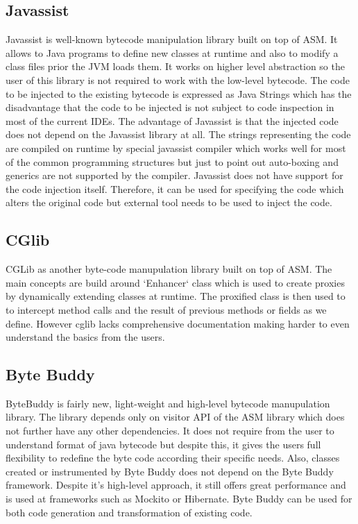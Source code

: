 \subsection{Javassist}
Javassist is well-known bytecode manipulation library built on top of ASM. It allows to Java programs to define new classes at runtime and also to modify a class files prior the JVM loads them. It works on higher level abstraction so the user of this library is not required to work with the low-level bytecode. The code to be injected to the existing bytecode is expressed as Java Strings which has the disadvantage that the code to be injected is not subject to code inspection in most of the current IDEs. The advantage of Javassist is that the injected code does not depend on the Javassist library at all. 
The strings representing the code are compiled on runtime by special javassist compiler which works well for most of the common programming structures but just to point out auto-boxing and generics are not supported by the compiler.
Javassist does not have support for the code injection itself. Therefore, it can be used for specifying the code which alters the original code but external tool needs to be used to inject the code.
\subsection{CGlib}
CGLib as another byte-code manupulation library built on top of ASM. The main concepts are build around `Enhancer` class which is used to create proxies by dynamically extending classes at runtime. The proxified class is then used to to intercept method calls and the result of previous methods or fields as we define. However cglib lacks comprehensive documentation making harder to even understand the basics from the users.

\subsection{Byte Buddy}
ByteBuddy is fairly new, light-weight and high-level bytecode manupulation library. The library depends only on visitor API of the ASM library which does not further have any other dependencies. It does not require from the user to understand format of java bytecode but despite this, it gives the users full flexibility to redefine the byte code according their specific needs. Also, classes created or instrumented by Byte Buddy does not depend on the Byte Buddy framework. Despite it's high-level approach, it still offers great performance and is used at frameworks such as Mockito or Hibernate. Byte Buddy can be used for both code generation and transformation of existing code.
